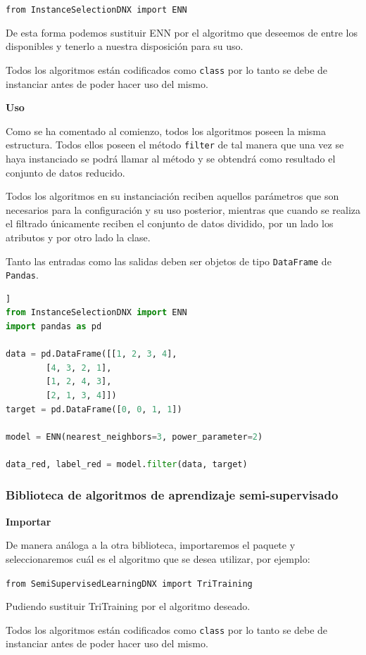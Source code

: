 \texttt{from InstanceSelectionDNX import ENN} 

De esta forma podemos sustituir ENN por el algoritmo que deseemos de entre los disponibles y tenerlo a nuestra disposición para su uso.

Todos los algoritmos están codificados como \texttt{class} por lo tanto se debe de instanciar antes de poder hacer uso del mismo. 

\textbf{Uso}

Como se ha comentado al comienzo, todos los algoritmos poseen la misma estructura. Todos ellos poseen el método \texttt{filter} de tal manera que una vez se haya instanciado se podrá llamar al método y se obtendrá como resultado el conjunto de datos reducido.

Todos los algoritmos en su instanciación reciben aquellos parámetros que son necesarios para la configuración y su uso posterior, mientras que cuando se realiza el filtrado únicamente reciben el conjunto de datos dividido, por un lado los atributos y por otro lado la clase.

Tanto las entradas como las salidas deben ser objetos de tipo \texttt{DataFrame} de \texttt{Pandas}.

\begin{lstlisting}[language=python, caption={Ejemplo de uso de ENN}]]
from InstanceSelectionDNX import ENN
import pandas as pd

data = pd.DataFrame([[1, 2, 3, 4],
        [4, 3, 2, 1],
        [1, 2, 4, 3],
        [2, 1, 3, 4]])
target = pd.DataFrame([0, 0, 1, 1])

model = ENN(nearest_neighbors=3, power_parameter=2)

data_red, label_red = model.filter(data, target)
\end{lstlisting}

\subsubsection{Biblioteca de algoritmos de aprendizaje semi-supervisado}
\textbf{Importar}

De manera análoga a la otra biblioteca, importaremos el paquete y seleccionaremos cuál es el algoritmo que se desea utilizar, por ejemplo:

\texttt{from SemiSupervisedLearningDNX import TriTraining}

Pudiendo sustituir TriTraining por el algoritmo deseado.

Todos los algoritmos están codificados como \texttt{class} por lo tanto se debe de instanciar antes de poder hacer uso del mismo. 

